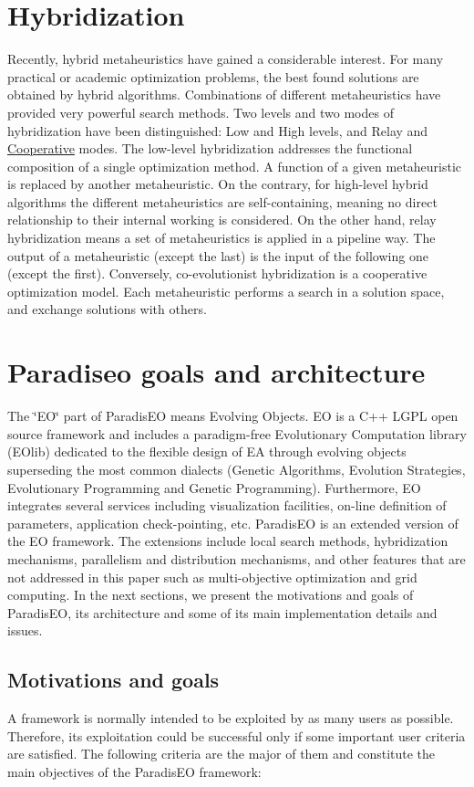 \hypertarget{main_hybridization}{}\section{Hybridization}\label{main_hybridization}
Recently, hybrid metaheuristics have gained a considerable interest. For many practical or academic optimization problems, the best found solutions are obtained by hybrid algorithms. Combinations of different metaheuristics have provided very powerful search methods. Two levels and two modes of hybridization have been distinguished: Low and High levels, and Relay and \hyperlink{classCooperative}{Cooperative} modes. The low-level hybridization addresses the functional composition of a single optimization method. A function of a given metaheuristic is replaced by another metaheuristic. On the contrary, for high-level hybrid algorithms the different metaheuristics are self-containing, meaning no direct relationship to their internal working is considered. On the other hand, relay hybridization means a set of metaheuristics is applied in a pipeline way. The output of a metaheuristic (except the last) is the input of the following one (except the first). Conversely, co-evolutionist hybridization is a cooperative optimization model. Each metaheuristic performs a search in a solution space, and exchange solutions with others.\hypertarget{main_paradiseo_goals}{}\section{Paradiseo goals and architecture}\label{main_paradiseo_goals}
The \char`\"{}EO\char`\"{} part of Paradis\-EO means Evolving Objects. EO is a C++ LGPL open source framework and includes a paradigm-free Evolutionary Computation library (EOlib) dedicated to the flexible design of EA through evolving objects superseding the most common dialects (Genetic Algorithms, Evolution Strategies, Evolutionary Programming and Genetic Programming). Furthermore, EO integrates several services including visualization facilities, on-line definition of parameters, application check-pointing, etc. Paradis\-EO is an extended version of the EO framework. The extensions include local search methods, hybridization mechanisms, parallelism and distribution mechanisms, and other features that are not addressed in this paper such as multi-objective optimization and grid computing. In the next sections, we present the motivations and goals of Paradis\-EO, its architecture and some of its main implementation details and issues.\hypertarget{main_motivation}{}\subsection{Motivations and goals}\label{main_motivation}
A framework is normally intended to be exploited by as many users as possible. Therefore, its exploitation could be successful only if some important user criteria are satisfied. The following criteria are the major of them and constitute the main objectives of the Paradis\-EO framework:

